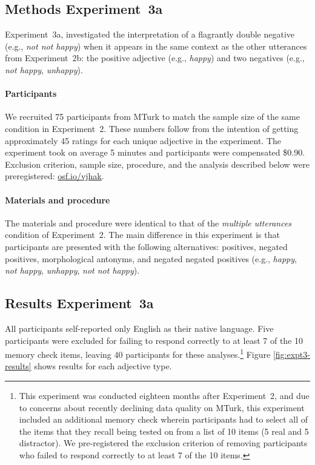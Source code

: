 \documentclass[floatsintext,doc]{apa6}
\let\oldparagraph\paragraph
\renewcommand{\paragraph}[1]{\oldparagraph{#1}\mbox{}}
\let\rmarkdownfootnote\footnote%
\def\footnote{\protect\rmarkdownfootnote}
\begin{document}



\subsection{Methods Experiment~3a}

Experiment~3a, investigated the interpretation of a flagrantly double negative (e.g., \emph{not not happy}) when it appears in the same context as the other utterances from Experiment~2b: the positive adjective (e.g., \emph{happy}) and two negatives (e.g., \emph{not happy}, \emph{unhappy}).


\paragraph{Participants}\label{participants-3}
We recruited 75 participants from MTurk to match the sample size of the same condition in Experiment~2.
These numbers follow from the intention of getting approximately 45 ratings for each unique adjective in the experiment.
The experiment took on average 5 minutes and participants were compensated \$0.90.
Exclusion criterion, sample size, procedure, and the analysis described below were preregistered: \url{osf.io/vjhak}.

\paragraph{Materials and procedure}\label{materials-3}
The materials and procedure were identical to that of the \emph{multiple utterances} condition of Experiment~2.
The main difference in this experiment is that participants are presented with the following alternatives: positives, negated positives, morphological antonyms, and negated negated positives (e.g., \emph{happy}, \emph{not happy}, \emph{unhappy}, \emph{not not happy}).


\subsection{Results Experiment~3a}

All participants self-reported only English as their native language. Five participants were excluded for failing to respond correctly to at least 7 of the 10 memory check items, leaving 40 participants for these analyses.\footnote{This experiment was conducted eighteen months after Experiment~2, and due to concerns about recently declining data quality on MTurk, this experiment included an additional memory check wherein participants had to select all of the items that they recall being tested on from a list of 10 items (5 real and 5 distractor). 
We pre-registered the exclusion criterion of removing participants who failed to respond correctly to at least 7 of the 10 items. }
Figure \ref{fig:expt3-results} shows results for each adjective type.
\end{document}
